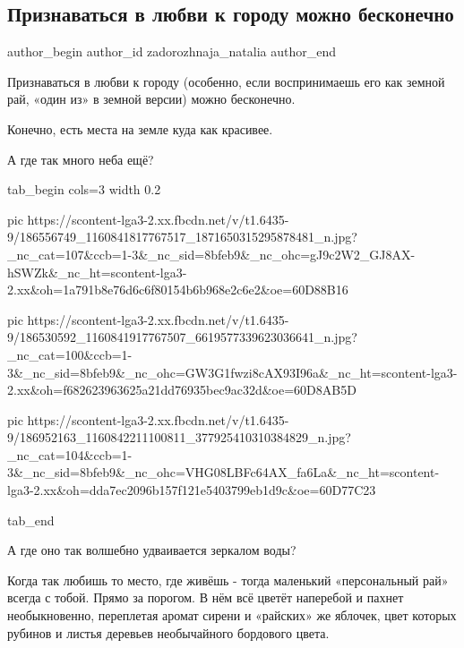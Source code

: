  
 
 
 
 
\subsection{Признаваться в любви к городу  можно бесконечно}
\label{sec:16_05_2021.fb.zadorozhnaja_natalia.1.ljubov_gorod}
\ifcmt
 author_begin
   author_id zadorozhnaja_natalia
 author_end
\fi

Признаваться в любви к городу (особенно, если воспринимаешь его как земной рай, «один из» в земной версии) можно бесконечно.

Конечно, есть места на земле куда как красивее.

А где так много неба ещё? 

\ifcmt
  tab_begin cols=3
		 width 0.2

     pic https://scontent-lga3-2.xx.fbcdn.net/v/t1.6435-9/186556749_1160841817767517_1871650315295878481_n.jpg?_nc_cat=107&ccb=1-3&_nc_sid=8bfeb9&_nc_ohc=gJ9c2W2_GJ8AX-hSWZk&_nc_ht=scontent-lga3-2.xx&oh=1a791b8e76d6c6f80154b6b968e2c6e2&oe=60D88B16

     pic https://scontent-lga3-2.xx.fbcdn.net/v/t1.6435-9/186530592_1160841917767507_6619577339623036641_n.jpg?_nc_cat=100&ccb=1-3&_nc_sid=8bfeb9&_nc_ohc=GW3G1fwzi8cAX93I96a&_nc_ht=scontent-lga3-2.xx&oh=f682623963625a21dd76935bec9ac32d&oe=60D8AB5D

     pic https://scontent-lga3-2.xx.fbcdn.net/v/t1.6435-9/186952163_1160842211100811_377925410310384829_n.jpg?_nc_cat=104&ccb=1-3&_nc_sid=8bfeb9&_nc_ohc=VHG08LBFc64AX_fa6La&_nc_ht=scontent-lga3-2.xx&oh=dda7ec2096b157f121e5403799eb1d9c&oe=60D77C23

  tab_end
\fi

А где оно так волшебно удваивается зеркалом воды?

Когда так любишь то место, где живёшь - тогда маленький «персональный рай»
всегда с тобой. Прямо за порогом. В нём всё цветёт наперебой и пахнет
необыкновенно, переплетая аромат сирени и «райских» же яблочек, цвет которых
рубинов и листья деревьев необычайного бордового цвета. 

